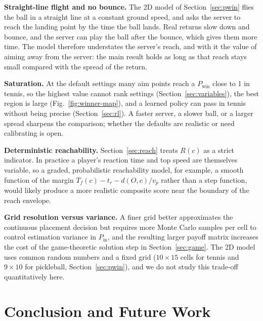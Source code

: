   \textbf{Straight-line flight and no bounce.} The 2D model of
  Section~\ref{sec:pwin} flies the ball in a straight line at a constant ground
  speed, and asks the server to reach the landing point by the time the ball
  lands. Real returns slow down and bounce, and the server can play the ball
  after the bounce, which gives them more time. The model therefore understates
  the server's reach, and with it the value of aiming away from the server: the
  main result holds as long as that reach stays small compared with the spread
  of the return.

  \textbf{Saturation.} At the default settings many aim points reach a
  $P_{\mathrm{win}}$ close to 1 in tennis, so the highest value cannot rank
  settings (Section~\ref{sec:variables}), the best region is large
  (Fig.~\ref{fig:winner-map}), and a learned policy can pass in tennis without
  being precise (Section~\ref{sec:rl}). A faster server, a slower ball, or a
  larger spread sharpens the comparison; whether the defaults are realistic or
  need calibrating is open.

  \textbf{Deterministic reachability.} Section~\ref{sec:reach} treats $R(c)$ as
  a strict indicator. In practice a player's reaction time and top speed are
  themselves variable, so a graded, probabilistic reachability model, for
  example, a smooth function of the margin $T_f(c) - t_r - d(O,c)/v_p$ rather
  than a step function, would likely produce a more realistic composite score
  near the boundary of the reach envelope.

  \textbf{Grid resolution versus variance.} A finer grid better approximates the
  continuous placement decision but requires more Monte Carlo samples per cell
  to control estimation variance in $P_{\mathrm{in}}$, and the resulting larger
  payoff matrix increases the cost of the game-theoretic solution step in
  Section~\ref{sec:game}. The 2D model uses common random numbers and a fixed
  grid ($10 \times 15$ cells for tennis and $9 \times 10$ for pickleball,
  Section~\ref{sec:pwin}), and we do not study this trade-off quantitatively
  here.

  \section{Conclusion and Future Work}\label{sec:conclusion}

